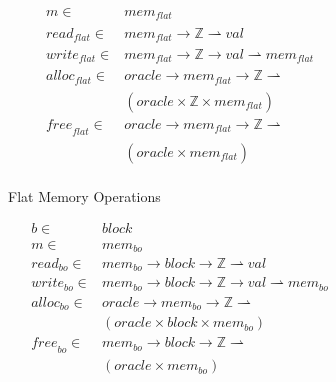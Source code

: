 \documentclass{article}
\begin{document}
\begin{figure}
  \begin{subfigure}{0.5\textwidth}
    \[\begin{split}
    m \in & \mathit{mem}_{\mathit{flat}} \\
    \mathit{read}_{\mathit{flat}} \in & \mathit{mem}_{\mathit{flat}} \rightarrow
    \mathbb{Z} \rightharpoonup \mathit{val} \\
    \mathit{write}_{\mathit{flat}} \in & \mathit{mem}_{\mathit{flat}} \rightarrow
    \mathbb{Z} \rightarrow \mathit{val} \rightharpoonup \mathit{mem}_{\mathit{flat}} \\
    \mathit{alloc}_{\mathit{flat}} \in & \mathit{oracle} \rightarrow
    \mathit{mem}_{\mathit{flat}} \rightarrow \mathbb{Z} \rightharpoonup \\
    & (\mathit{oracle} \times \mathbb{Z}
    \times \mathit{mem}_{\mathit{flat}}) \\
    \mathit{free}_{\mathit{flat}} \in & \mathit{oracle} \rightarrow \mathit{mem}_{\mathit{flat}} \rightarrow
    \mathbb{Z} \rightharpoonup \\
    & (\mathit{oracle} \times \mathit{mem}_{\mathit{flat}}) \\
    \end{split}\]

    \caption{Flat Memory Operations}
    \label{fig:flat}
  \end{subfigure}
  \begin{subfigure}{0.5\textwidth}
    \[\begin{split}
    b \in & \mathit{block} \\
    m \in & \mathit{mem}_{bo} \\
    \mathit{read}_{bo} \in & \mathit{mem}_{bo} \rightarrow \mathit{block} \rightarrow
    \mathbb{Z} \rightharpoonup \mathit{val} \\
    \mathit{write}_{bo} \in & \mathit{mem}_{bo} \rightarrow \mathit{block} \rightarrow
    \mathbb{Z} \rightarrow \mathit{val} \rightharpoonup \mathit{mem}_{bo} \\
    \mathit{alloc}_{bo} \in & \mathit{oracle} \rightarrow \mathit{mem}_{bo} \rightarrow
    \mathbb{Z} \rightharpoonup \\
    & (\mathit{oracle} \times \mathit{block} \times \mathit{mem}_{bo}) \\
    \mathit{free}_{bo} \in & \mathit{mem}_{bo} \rightarrow \mathit{block} \rightarrow
    \mathbb{Z} \rightharpoonup \\
    & (\mathit{oracle} \times \mathit{mem}_{bo}) \\
    \end{split}\]
    

\end{subfigure}
\end{figure}
\end{document}

